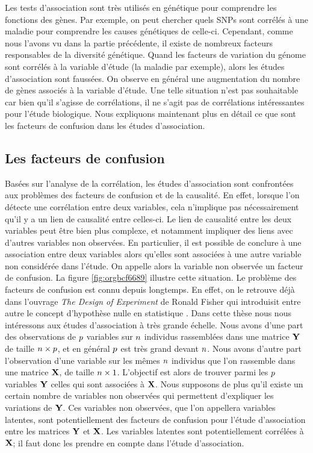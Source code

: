 \documentclass[12pt,a4paper,twoside]{ugathesis}
\begin{document}
Les tests d'association sont très utilisés en génétique pour comprendre les
fonctions des gènes. Par exemple, on peut chercher quels SNPs sont corrélés à
une maladie pour comprendre les causes génétiques de celle-ci. Cependant, comme
nous l'avons vu dans la partie précédente, il existe de nombreux facteurs
responsables de la diversité génétique. Quand les facteurs de variation du
génome sont corrélés à la variable d'étude (la maladie par exemple), alors les
études d'association sont faussées. On observe en général une augmentation du
nombre de gènes associés à la variable d'étude. Une telle situation n'est pas
souhaitable car bien qu'il s'agisse de corrélations, il ne s'agit pas de
corrélations intéressantes pour l'étude biologique. Nous expliquons maintenant
plus en détail ce que sont les facteurs de confusion dans les études
d'association.

\subsection{Les facteurs de confusion}
\label{sec:org2c03a9d}
\label{orga426048}

Basées sur l'analyse de la corrélation, les études d'association sont
confrontées aux problèmes des facteurs de confusion et de la causalité. En
effet, lorsque l'on détecte une corrélation entre deux variables, cela
n'implique pas nécessairement qu'il y a un lien de causalité entre celles-ci. Le
lien de causalité entre les deux variables peut être bien plus complexe, et
notamment impliquer des liens avec d'autres variables non observées. En
particulier, il est possible de conclure à une association entre deux variables
alors qu'elles sont associées à une autre variable non considérée dans l'étude.
On appelle alors la variable non observée un facteur de confusion. La figure
\ref{fig:orgbcf6689} illustre cette situation. Le problème des facteurs de
confusion est connu depuis longtemps. En effet, on le retrouve déjà dans
l'ouvrage \emph{The Design of Experiment} de Ronald Fisher qui introduisit entre
autre le concept d'hypothèse nulle en statistique \citep{fisher1937design}. Dans
cette thèse nous nous intéressons aux études d'association à très grande
échelle. Nous avons d'une part des observations de \(p\) variables sur \(n\)
individus rassemblées dans une matrice \(\mathbf{Y}\) de taille \(n \times p\), et
en général \(p\) est très grand devant \(n\). Nous avons d'autre part
l'observation d'une variable sur les mêmes \(n\) individus que l'on rassemble
dans une matrice \(\mathbf{X}\), de taille \(n \times 1\). L'objectif est alors de
trouver parmi les \(p\) variables \(\mathbf{Y}\) celles qui sont associées à \(\mathbf{X}\). Nous
supposons de plus qu'il existe un certain nombre de variables non observées qui
permettent d'expliquer les variations de \(\mathbf{Y}\). Ces variables non observées, que
l'on appellera variables latentes, sont potentiellement des facteurs de
confusion pour l'étude d'association entre les matrices \(\mathbf{Y}\) et \(\mathbf{X}\). Les
variables latentes sont potentiellement corrélées à \(\mathbf{X}\); il faut donc les
prendre en compte dans l'étude d'association.
\end{document}
